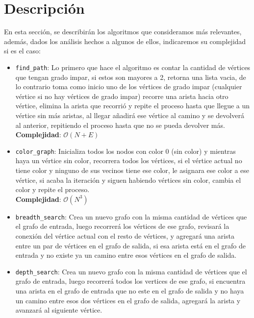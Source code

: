 \documentclass[conference]{IEEEtran}
\begin{document}
\section{Descripción}
En esta sección, se describirán los algoritmos que consideramos más relevantes, además, dados los análisis hechos a algunos de ellos, indicaremos su complejidad si es el caso:
\begin{itemize}
\item \texttt{find\_path}: Lo primero que hace el algoritmo es contar la cantidad de vértices que tengan grado impar, si estos son mayores a 2, retorna una lista vacia, de lo contrario toma como inicio uno de los vértices de grado impar (cualquier vértice si no hay vértices de grado impar) recorre una arista hacia otro vértice, elimina la arista que recorrió y repite el proceso hasta que llegue a un vértice sin más aristas, al llegar añadirá ese vértice al camino y se devolverá al anterior, repitiendo el proceso hasta que no se pueda devolver más. \\ \textbf{Complejidad}: $\mathcal{O}(N+E)$
\item \texttt{color\_graph}: Inicializa todos los nodos con color 0 (sin color) y mientras haya un vértice sin color, recorrera todos los vértices, si el vértice actual no tiene color y ninguno de sus vecinos tiene ese color, le asignara ese color a ese vértice, si acaba la iteración y siguen habiendo vértices sin color, cambia el color y repite el proceso.\\ \textbf{Complejidad}: $\mathcal{O}(N^3)$
\item \texttt{breadth\_search}: Crea un nuevo grafo con la misma cantidad de vértices que el grafo de entrada, luego recorrerá los vértices de ese grafo, revisará la conexión del vértice actual con el resto de vértices, y agregará una arista entre un par de vértices en el grafo de salida, si esa arista está en el grafo de entrada y no existe ya un camino entre esos vértices en el grafo de salida.\\
\item \texttt{depth\_search}: Crea un nuevo grafo con la misma cantidad de vértices que el grafo de entrada, luego recorrerá todos los vertices de ese grafo, si encuentra una arista en el grafo de entrada que no este en el grafo de salida y no haya un camino entre esos dos vértices en el grafo de salida, agregará la arista y avanzará al siguiente vértice.\\

\end{itemize}
\end{document}
